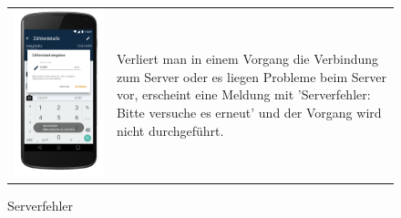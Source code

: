 \begin{figure}[h]
\begin{tabularx}{\textwidth}{X  X}
	\includegraphics[scale = 0.155]{img/AndroidMockup/serverException} \caption{Serverfehler} & Verliert man in einem Vorgang die Verbindung zum Server oder es liegen Probleme beim Server vor, erscheint eine Meldung mit 'Serverfehler: Bitte versuche es erneut' und der Vorgang wird nicht durchgeführt. \\

\end{tabularx}
\end{figure}

